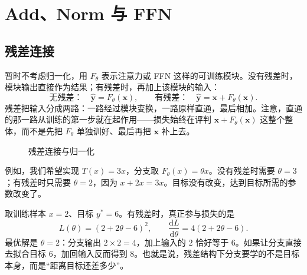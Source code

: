 \documentclass[UTF8,a4paper,12pt]{ctexart}
\numberwithin{equation}{section}
\begin{document}
\section{Add、Norm 与 FFN}
\label{sec:block}

\subsection{残差连接}

暂时不考虑归一化，用 $F_\theta$ 表示注意力或 FFN 这样的可训练模块。没有残差时，模块输出直接作为结果；有残差时，再加上该模块的输入：
\begin{equation}
\text{无残差：}\quad \hat{\bm y}=F_\theta(\bm x),
\qquad
\text{有残差：}\quad \hat{\bm y}=\bm x+F_\theta(\bm x).
\label{eq:residual}
\end{equation}
残差把输入分成两路：一路经过模块变换，一路原样直通，最后相加。注意，直通的那一路从训练的第一步就在起作用——损失始终在评判 $\bm x+F_\theta(\bm x)$ 这整个整体，而不是先把 $F_\theta$ 单独训好、最后再把 $\bm x$ 补上去。

\begin{figure}[htbp]
\centering
{}
\caption{残差连接与归一化}
\label{fig:residual}
\end{figure}

例如，我们希望实现 $T(x)=3x$，分支取 $F_\theta(x)=\theta x$。没有残差时需要 $\theta=3$；有残差时只需要 $\theta=2$，因为 $x+2x=3x$。目标没有改变，达到目标所需的参数改变了。

取训练样本 $x=2$、目标 $y^*=6$。有残差时，真正参与损失的是
\begin{equation}
L(\theta)=(2+2\theta-6)^2,
\qquad \frac{\mathrm dL}{\mathrm d\theta}=4(2+2\theta-6).
\label{eq:residualloss}
\end{equation}
最优解是 $\theta=2$：分支输出 $2\times2=4$，加上输入的 $2$ 恰好等于 $6$。如果让分支直接去拟合目标 $6$，加回输入反而得到 $8$。也就是说，残差结构下分支要学的不是目标本身，而是``距离目标还差多少''。
\end{document}
